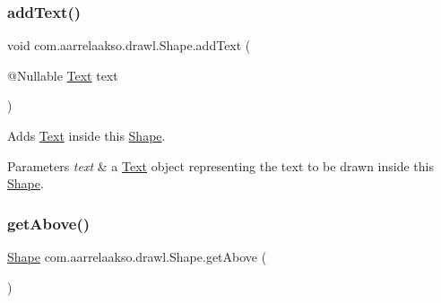 \mbox{\label{classcom_1_1aarrelaakso_1_1drawl_1_1_shape_a9784264f6abcf623b2774d6ef2a53fdc}} 
\subsubsection{\texorpdfstring{add\+Text()}{addText()}}
{\footnotesize\ttfamily void com.\+aarrelaakso.\+drawl.\+Shape.\+add\+Text (\begin{DoxyParamCaption}\item[{@Nullable \hyperlink{classcom_1_1aarrelaakso_1_1drawl_1_1_text}{Text}}]{text }\end{DoxyParamCaption})\hspace{0.3cm}{\ttfamily [inherited]}}



Adds \hyperlink{classcom_1_1aarrelaakso_1_1drawl_1_1_text}{Text} inside this \hyperlink{classcom_1_1aarrelaakso_1_1drawl_1_1_shape}{Shape}. 


\begin{DoxyParams}{Parameters}
{\em text} & a \hyperlink{classcom_1_1aarrelaakso_1_1drawl_1_1_text}{Text} object representing the text to be drawn inside this \hyperlink{classcom_1_1aarrelaakso_1_1drawl_1_1_shape}{Shape}. \\
\hline
\end{DoxyParams}
\mbox{\label{classcom_1_1aarrelaakso_1_1drawl_1_1_shape_acebea2aa57031322323c9bf50ee447db}} 
\subsubsection{\texorpdfstring{get\+Above()}{getAbove()}}
{\footnotesize\ttfamily \hyperlink{classcom_1_1aarrelaakso_1_1drawl_1_1_shape}{Shape} com.\+aarrelaakso.\+drawl.\+Shape.\+get\+Above (\begin{DoxyParamCaption}{ }\end{DoxyParamCaption})\hspace{0.3cm}{\ttfamily [inherited]}}



